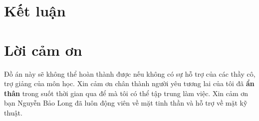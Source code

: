 \section{Kết luận}


\section{Lời cảm ơn}
Đồ án này sẽ không thể hoàn thành được nếu không có sự hỗ trợ của các thầy cô, trợ giảng của môn học. Xin cảm ơn chân thành người yêu tương lai của tôi đã \textbf{ẩn thân} trong suốt thời gian qua để mà tôi có thể tập trung làm việc. Xin cảm ơn bạn Nguyễn Bảo Long đã luôn động viên về mặt tinh thần và hỗ trợ về mặt kỹ thuật.